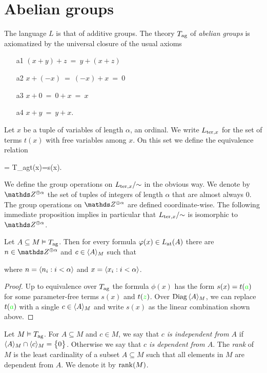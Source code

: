 \section{Abelian groups}
\label{gruppi}
The language $L$ is that of additive groups.
%
The theory \emph{$T_{\rm ag}$} of \emph{abelian groups\/} is axiomatized by the universal closure of the usual axioms\nobreak
\begin{itemize}
\item[a1] $(x+y) +z\ =\ y+(x+z)$
\item[a2] $x+(-x)\ =\ (-x)+x\ =\ 0$
\item[a3] $x+0\ = \ 0+x\ = \ x$
\item[a4] $x+y\ =\ y+x$.
\end{itemize}
Let $x$ be a tuple of variables of length $\alpha$, an ordinal.
%
We write $L_{{\rm ter},x}$ for the set of terms $t(x)$ with free variables among $x$.
%
On this set we define the equivalence relation

%
{=}%
{T_{\rm ag}\proves t(x)=s(x).}

We define the group operations on $L_{{\rm ter},x}/\mathord{\sim}$ in the obvious way.
%
We denote by $\ZZ^{\oplus\alpha}$ the set of tuples of integers of length $\alpha$ that are almost always $0$.
%
The group operations on $\ZZ^{\oplus\alpha}$ are defined coordinate-wise.
%
The following immediate proposition implies in particular that  $L_{{\rm ter},x}/\mathord{\sim}$ is isomorphic to $\ZZ^{\oplus\alpha}$.

\begin{proposition}\label{corol_formacanonicaterminimoduli}
  Let $A\subseteq M\models T_{\rm ag}$.
  Then for every formula $\phi(x)\in L_{\rm at}(A)$ there are $n\in\ZZ^{\oplus\alpha}$ and $c\in\<A\>_M$ such that 


  where $n=\<n_i:i<\alpha\>$ and  $x=\<x_i:i<\alpha\>$.
\end{proposition}

\begin{proof}
  Up to equivalence over $T_{\rm ag}$ the formula $\phi(x)$ has the form $s(x)=t({\gr a})$ for some parameter-free terms $s(x)$ and $t({\gr z})$.
  Over $\Diag\,\<A\>_M$, we can replace $t({\gr a})$ with a single  $c\in \<A\>_M$ and write $s(x)$ as the linear combination shown above.
\end{proof}

\begin{definition}\label{def_rank_independece_ag}
  Let $M\models T_{\rm ag}$.
  For $A\subseteq M$ and  $c\in M$, we say that  \emph{$c$ is independent from $A$\/} if $\<A\>_M\cap\<c\>_M=\big\{0\big\}$.
  Otherwise we say that \emph{$c$ is dependent from $A$}.
  The \emph{rank\/} of $M$ is the least cardinality of a subset $A\subseteq M$ such that all elements in $M$ are dependent from $A$.
  We denote it by \emph{$\rank(M)$}.
\end{definition}  

